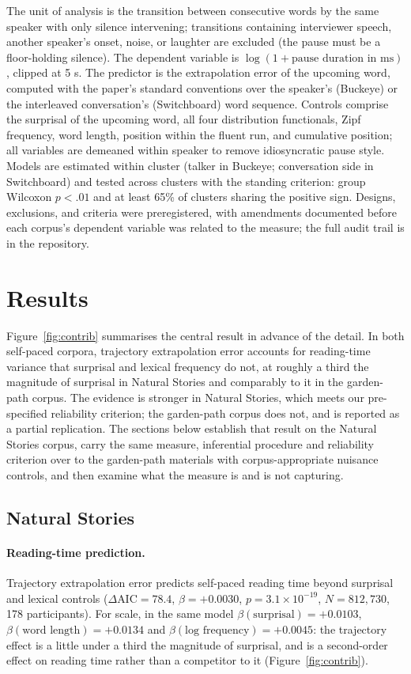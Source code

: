 \documentclass[12pt]{article}
\newcommand{\new}[1]{#1}   %
\begin{document}
{The unit of analysis is the transition between consecutive words by the same speaker with only silence intervening; transitions containing interviewer speech, another speaker's onset, noise, or laughter are excluded (the pause must be a floor-holding silence). The dependent variable is $\log(1 + \text{pause duration in ms})$, clipped at 5 s. The predictor is the extrapolation error of the upcoming word, computed with the paper's standard conventions over the speaker's (Buckeye) or the interleaved conversation's (Switchboard) word sequence. Controls comprise the surprisal of the upcoming word, all four distribution functionals, Zipf frequency, word length, position within the fluent run, and cumulative position; all variables are demeaned within speaker to remove idiosyncratic pause style. Models are estimated within cluster (talker in Buckeye; conversation side in Switchboard) and tested across clusters with the standing criterion: group Wilcoxon $p < .01$ and at least 65\% of clusters sharing the positive sign. Designs, exclusions, and criteria were preregistered, with amendments documented before each corpus's dependent variable was related to the measure; the full audit trail is in the repository.}

\section{Results}

\new{Figure~\ref{fig:contrib} summarises the central result in advance of the
detail. In both self-paced corpora, trajectory extrapolation error accounts for
reading-time variance that surprisal and lexical frequency do not, at roughly a
third the magnitude of surprisal in Natural Stories and comparably to it in the
garden-path corpus. The evidence is stronger in Natural Stories, which meets our
pre-specified reliability criterion; the garden-path corpus does not, and is
reported as a partial replication. The sections below establish that result on the Natural
Stories corpus, carry the same measure, inferential procedure and reliability
criterion over to the garden-path materials with corpus-appropriate nuisance
controls, and
then examine what the measure is and is not capturing.}

\subsection{Natural Stories}

\new{\paragraph{Reading-time prediction.} Trajectory extrapolation error predicts self-paced reading time beyond surprisal and lexical controls ($\Delta\text{AIC} = 78.4$, $\beta = +0.0030$, $p = 3.1 \times 10^{-19}$, $N = 812{,}730$, 178 participants). For scale, in the same model $\beta(\text{surprisal}) = +0.0103$, $\beta(\text{word length}) = +0.0134$ and $\beta(\text{log frequency}) = +0.0045$: the trajectory effect is a little under a third the magnitude of surprisal, and is a second-order effect on reading time rather than a competitor to it (Figure~\ref{fig:contrib}).}
\end{document}
